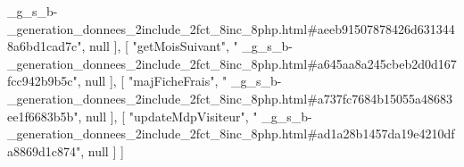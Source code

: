 \begin{DoxyCode}
{      \_g\_s\_b-\_generation\_donnees\_2include\_2fct\_8inc\_8php.html#aeeb91507878426d6313448a6bd1cad7c"}, null ],
    [ \textcolor{stringliteral}{"getMoisSuivant"}, \textcolor{stringliteral}{"
      \_g\_s\_b-\_generation\_donnees\_2include\_2fct\_8inc\_8php.html#a645aa8a245cbeb2d0d167fcc942b9b5c"}, null ],
    [ \textcolor{stringliteral}{"majFicheFrais"}, \textcolor{stringliteral}{"
      \_g\_s\_b-\_generation\_donnees\_2include\_2fct\_8inc\_8php.html#a737fc7684b15055a48683ee1f6683b5b"}, null ],
    [ \textcolor{stringliteral}{"updateMdpVisiteur"}, \textcolor{stringliteral}{"
      \_g\_s\_b-\_generation\_donnees\_2include\_2fct\_8inc\_8php.html#ad1a28b1457da19e4210dfa8869d1c874"}, null ]
]
\end{DoxyCode}
